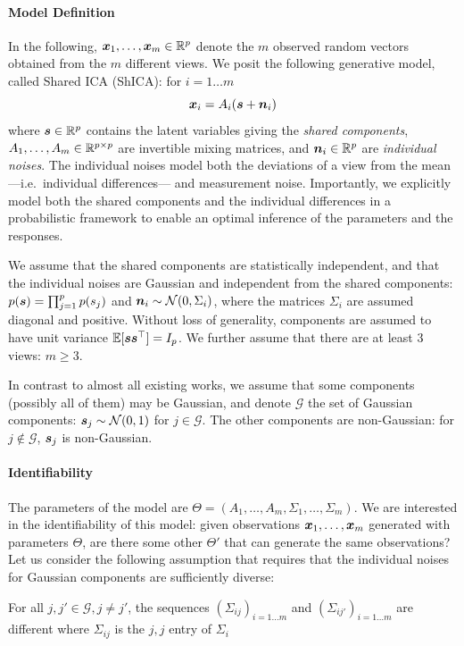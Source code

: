 \paragraph{Model Definition} In the following, $\boldsymbol{x}_1, \dots ,\boldsymbol{x}_m \in \mathbb{R}^p$ denote the $m$ observed random vectors obtained from the $m$ different views. We posit the following generative model, called Shared ICA (ShICA): for $i= 1\dots m$
\begin{equation}
  \label{eq:model}
   \boldsymbol{x}_i = A_i(\boldsymbol{s} + \boldsymbol{n}_i)
\end{equation}
where $\boldsymbol{s} \in \mathbb{R}^{p}$ contains the latent variables giving the \emph{shared components}, $A_1,\dots, A_m\in\mathbb{R}^{p\times p}$ are invertible mixing matrices, and $\boldsymbol{n}_i \in
\mathbb{R}^{p}$ are \emph{individual noises}. The individual noises model both the deviations of a view  from the mean ---i.e.\ individual differences--- and measurement noise. Importantly, we explicitly model both the shared components and the individual differences in a probabilistic framework to enable an optimal inference of the parameters and the responses.

We assume that the shared components are statistically independent, and that the individual noises are Gaussian and independent from the shared components:
$p(\boldsymbol{s}) = \prod_{j=1}^p p(s_j)$ and $\boldsymbol{n}_i \sim\mathcal{N}(0, \Sigma_i)$, where the matrices $\Sigma_i$ are assumed diagonal and positive. Without loss of generality, components are assumed to have unit variance $\mathbb{E}[\boldsymbol{s} \boldsymbol{s}^{\top}] = I_p$. We further assume that there are at least 3 views: $m \geq 3$. 

In contrast to almost all existing works, we assume that some components (possibly all of them) may be Gaussian, and denote $\mathcal{G}$ the set of Gaussian components: $\boldsymbol{s}_j \sim \mathcal{N}(0, 1)$ for $j \in \mathcal{G}$. The other components are non-Gaussian: for $j\notin \mathcal{G}$, $\boldsymbol{s}_j$ is non-Gaussian.


\paragraph{Identifiability} The parameters of the model are $\Theta = (A_1, \dots, A_m, \Sigma_1, \dots, \Sigma_m)$. We are interested in the identifiability of this model: given observations $\boldsymbol{x}_1,\dots, \boldsymbol{x}_m$ generated with parameters $\Theta$, are there some other $\Theta'$ that can generate the same observations?
Let us consider the following assumption that requires that the individual noises for Gaussian components are sufficiently diverse:
%
\begin{assumption}
\label{ass:diversity}
For all $j, j' \in \mathcal{G}, j \neq j'$, the sequences $(\Sigma_{ij})_{i=1 \dots m}$ and $(\Sigma_{ij'})_{i=1 \dots m}$ are different where $\Sigma_{ij}$ is the $j, j$ entry of $\Sigma_i$
\end{assumption}

